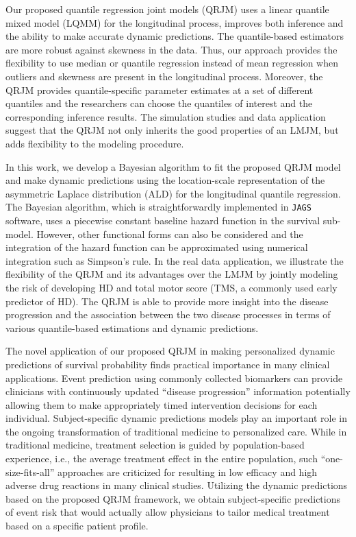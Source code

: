 \documentclass[Crown, sagev, times, doublespace]{sagej}
\begin{document}
Our proposed quantile regression joint models (QRJM) uses a linear quantile mixed model (LQMM) for the longitudinal process, improves both inference and the ability to make accurate dynamic predictions. The quantile-based estimators are more robust against skewness in the data. Thus, our approach provides the flexibility to use median or quantile regression instead of mean regression when outliers and skewness are present in the longitudinal process. Moreover, the QRJM provides quantile-specific parameter estimates at a set of different quantiles and the researchers can choose the quantiles of interest and the corresponding inference results. The simulation studies and data application suggest that the QRJM not only inherits the good properties of an LMJM, but adds flexibility to the modeling procedure.

In this work, we develop a Bayesian algorithm to fit the proposed QRJM model and make dynamic predictions using the location-scale representation of the asymmetric Laplace distribution (ALD) for the longitudinal quantile regression. The Bayesian algorithm, which is straightforwardly implemented in \texttt{JAGS} software, uses a piecewise constant baseline hazard function in the survival sub-model. However, other functional forms can also be considered and the integration of the hazard function can be approximated using numerical integration such as Simpson's rule. In the real data application, we illustrate the flexibility of the QRJM and its advantages over the LMJM by jointly modeling the risk of developing HD and total motor score (TMS, a commonly used early predictor of HD). The QRJM is able to provide more insight into the disease progression and the association between the two disease processes in terms of various quantile-based estimations and dynamic predictions.

The novel application of our proposed QRJM in making personalized dynamic predictions of survival probability finds practical importance in many clinical applications. Event prediction using commonly collected biomarkers can provide clinicians with continuously updated ``disease progression'' information potentially allowing them to make appropriately timed intervention decisions for each individual. Subject-specific dynamic predictions models play an important role in the ongoing transformation of traditional medicine to personalized care. While in traditional medicine, treatment selection is guided by population-based experience, i.e., the average treatment effect in the entire population, such ``one-size-fits-all'' approaches are criticized for resulting in low efficacy and high adverse drug reactions in many clinical studies. Utilizing the dynamic predictions based on the proposed QRJM framework, we obtain subject-specific predictions of event risk that would actually allow physicians to tailor medical treatment based on a specific patient profile.
\end{document}
